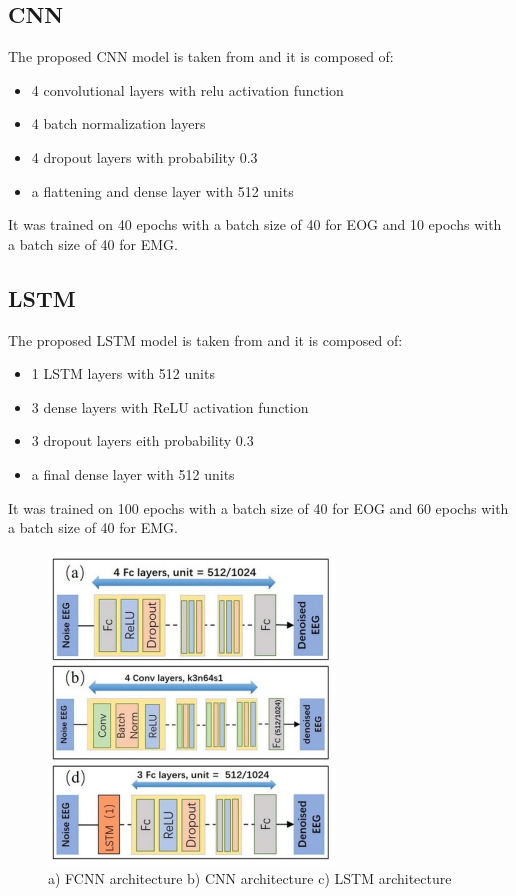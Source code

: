 \documentclass[a4paper]{sapthesis}
\begin{document}
\subsection{CNN}\label{sec:model_cnn}
The proposed CNN model is taken from\cite{EEGdenoiseNet} and it is 
composed of: 
\begin{itemize}
\item 4 convolutional layers with relu activation function
\item 4 batch normalization layers
\item 4 dropout layers with probability 0.3
\item a flattening and dense layer with 512 units
\end{itemize}
It was trained on 40 epochs with a batch size of 40 for EOG and 
10 epochs with a batch size of 40 for EMG.
\subsection{LSTM}\label{sec:model_lstm}
The proposed LSTM model is taken from\cite{EEGdenoiseNet} and it is 
composed of: 
\begin{itemize}
\item 1 LSTM layers with 512 units
\item 3 dense layers with ReLU activation function
\item 3 dropout layers eith probability 0.3
\item a final dense layer with 512 units
\end{itemize}
It was trained on 100 epochs with a batch size of 40 for EOG and 
60 epochs with a batch size of 40 for EMG.
\begin{figure}
\centering
\includegraphics[width=0.5\linewidth]{images/models_architecture_basic.png}
\caption{a) FCNN architecture b) CNN architecture c) LSTM architecture}
\end{figure}
\end{document}
